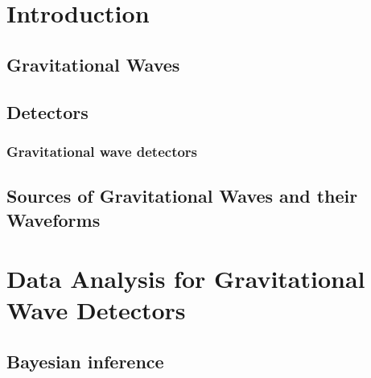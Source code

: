 \documentclass{kentigern}
\theoremstyle{definition}
\begin{document}
\mainmatter
\part{Introduction}
\label{part:intro}

 \chapter{Gravitational Waves}
 \label{cha:grav-waves}
 


 \chapter{Detectors}
 \label{cha:detectors}

 \section{Gravitational wave detectors}
 \label{sec:detectors}
 
 

 \chapter{Sources of Gravitational Waves and their Waveforms}
 \label{cha:sourc-grav-waves}
 

 

\part{Data Analysis for Gravitational Wave Detectors}
\label{part:data-analysis}
 
\chapter{Bayesian inference}
\label{cha:bayesian-inference}


\end{document}
